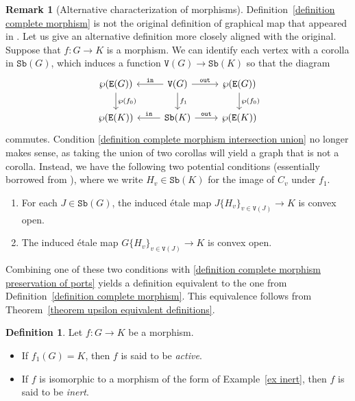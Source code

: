 \documentclass{amsart}
\numberwithin{theorem}{subsection}
\theoremstyle{definition}
\newtheorem{definition}[theorem]{Definition}
\newtheorem{remark}[theorem]{Remark}
\newcommand{\sub}{\mathtt{Sb}}
\newcommand{\out}{\mathtt{out}}
\newcommand{\inp}{\mathtt{in}}
\newcommand{\edge}{\mathtt{E}}
\newcommand{\vertex}{\mathtt{V}}
\begin{document}
\begin{remark}[Alternative characterization of morphisms]\label{remark alternative characterization of morphisms}
Definition~\ref{definition complete morphism} is not the original definition of graphical map that appeared in \cite{hrybook}.
Let us give an alternative definition more closely aligned with the original.
Suppose that $f\colon G \to K$ is a morphism. 
We can identify each vertex with a corolla in $\sub(G)$, which induces a function $\vertex(G) \to \sub(K)$ so that the diagram
\[
\begin{tikzcd}
\wp (\edge(G))  \dar["\wp(f_0)"] &\vertex(G)  \dar["f_1"] \lar["\inp" swap] \rar["\out"]& \wp (\edge(G))  \dar["\wp(f_0)"] \\
\wp (\edge(K))  & \sub(K) \lar["\inp" swap] \rar["\out"] & \wp (\edge(K))
\end{tikzcd}
\]
commutes.
Condition \eqref{definition complete morphism intersection union} no longer makes sense, as taking the union of two corollas will yield a graph that is not a corolla.
Instead, we have the following two potential conditions (essentially borrowed from \cite{hrybook}), where we write $H_v \in \sub(K)$ for the image of $C_v$ under $f_1$.
\begin{enumerate}[start=3]
	\item For each $J\in \sub(G)$, the induced \'etale map $J\{ H_v \}_{v\in \vertex(J)} \to K$ is convex open. \label{alternate def subgraphs}
	\item The induced \'etale map $G\{H_v\}_{v\in \vertex(J)} \to K$ is convex open. \label{alternate def whole graph}
\end{enumerate}
Combining one of these two conditions with \eqref{definition complete morphism preservation of ports} yields a definition equivalent to the one from Definition~\ref{definition complete morphism}.
This equivalence follows from Theorem~\ref{theorem upsilon equivalent definitions}.
\end{remark}

\begin{definition}\label{def intact Y}
Let $f\colon G \to K$ be a morphism.
\begin{itemize}
	\item If $f_1(G) = K$, then $f$ is said to be \emph{active}.
	\item If $f$ is isomorphic to a morphism of the form of Example~\ref{ex inert}, then $f$ is said to be \emph{inert}.
\end{itemize}
\end{definition}
\end{document}
